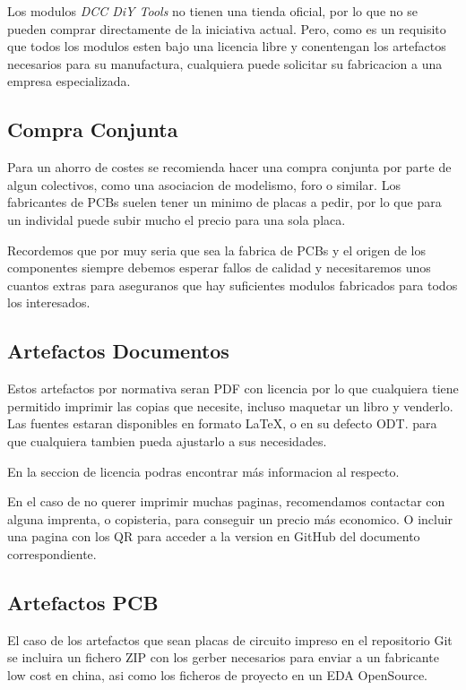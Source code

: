 Los modulos \textit{DCC DiY Tools} no tienen una tienda oficial, por lo que no
se pueden comprar directamente de la iniciativa actual. Pero, como es un requisito que
todos los modulos esten bajo una licencia libre y conentengan los artefactos necesarios
para su manufactura, cualquiera puede solicitar su fabricacion a una empresa
especializada.

\subsection{Compra Conjunta}
Para un ahorro de costes se recomienda hacer una compra conjunta por parte de algun
colectivos, como una asociacion de modelismo, foro o similar. Los fabricantes de 
PCBs suelen tener un minimo de placas a pedir, por lo que para un individal puede subir mucho el precio para 
una sola placa.

Recordemos que por muy seria que sea la fabrica de PCBs y el origen de los componentes
siempre debemos esperar fallos de calidad y
necesitaremos unos cuantos extras para aseguranos que hay suficientes modulos fabricados
para todos los interesados.

\subsection{Artefactos Documentos}
Estos artefactos por normativa seran PDF con licencia \doclicenseName por lo que 
cualquiera tiene permitido imprimir las copias que necesite, incluso maquetar un libro
y venderlo. 
Las fuentes estaran disponibles en formato \LaTeX, o en su defecto ODT. para que 
cualquiera tambien pueda ajustarlo a sus necesidades.

En la seccion de licencia podras encontrar más informacion al respecto.

En el caso de no querer imprimir muchas paginas, recomendamos contactar con alguna
imprenta, o copisteria, para conseguir un precio más economico. O incluir una pagina
con los QR para acceder a la version en GitHub del documento correspondiente.

\subsection{Artefactos PCB}
El caso de los artefactos que sean placas de circuito impreso en el repositorio Git 
se incluira un fichero ZIP con los gerber necesarios para enviar a un fabricante low
cost en china, asi
como los ficheros de proyecto en un EDA OpenSource.


